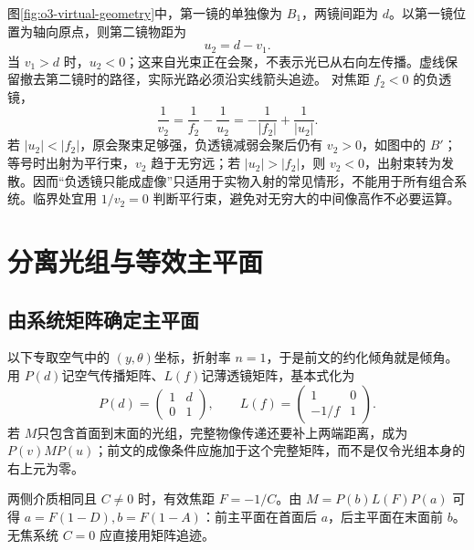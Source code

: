 图\ref{fig:o3-virtual-geometry}中，第一镜的单独像为 $B_1$，两镜间距为 $d$。以第一镜位置为轴向原点，则第二镜物距为
\[
 u_2=d-v_1.
\]
当 $v_1>d$ 时，$u_2<0$；这来自光束正在会聚，不表示光已从右向左传播。虚线保留撤去第二镜时的路径，实际光路必须沿实线箭头追迹。
对焦距 $f_2<0$ 的负透镜，
\[
 \frac1{v_2}=\frac1{f_2}-\frac1{u_2}
 =-\frac1{|f_2|}+\frac1{|u_2|}.
\]
若 $|u_2|<|f_2|$，原会聚束足够强，负透镜减弱会聚后仍有 $v_2>0$，如图中的 $B'$；等号时出射为平行束，$v_2$ 趋于无穷远；若 $|u_2|>|f_2|$，则 $v_2<0$，出射束转为发散。因而“负透镜只能成虚像”只适用于实物入射的常见情形，不能用于所有组合系统。临界处宜用 $1/v_2=0$ 判断平行束，避免对无穷大的中间像高作不必要运算。

\section{分离光组与等效主平面}

\subsection{由系统矩阵确定主平面}

以下专取空气中的 $(y,\theta)$坐标，折射率 $n=1$，于是前文的约化倾角就是倾角。用 $P(d)$记空气传播矩阵、$L(f)$记薄透镜矩阵，基本式化为
\[
 P(d)=\begin{pmatrix}1&d\\0&1\end{pmatrix},\qquad
 L(f)=\begin{pmatrix}1&0\\-1/f&1\end{pmatrix}.
\]
若 $M$只包含首面到末面的光组，完整物像传递还要补上两端距离，成为 $P(v)MP(u)$；前文的成像条件应施加于这个完整矩阵，而不是仅令光组本身的右上元为零。

两侧介质相同且 \(C\ne0\) 时，有效焦距 \(F=-1/C\)。由
\(M=P(b)L(F)P(a)\) 可得 \(a=F(1-D),b=F(1-A)\)：前主平面在首面后 \(a\)，后主平面在末面前 \(b\)。无焦系统 \(C=0\) 应直接用矩阵追迹。

